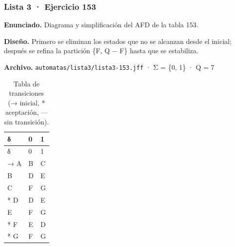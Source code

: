 
\hypertarget{lista-3-ejercicio-153}{%
\subsubsection{Lista 3 · Ejercicio 153}\label{lista-3-ejercicio-153}}

\textbf{Enunciado.} Diagrama y simplificación del AFD de la tabla 153.

\textbf{Diseño.} Primero se eliminan los estados que no se alcanzan desde el inicial; después se refina la partición \{F, Q − F\} hasta que se estabiliza.

\textbf{Archivo.} \texttt{automatas/lista3/lista3-153.jff} · Σ = \{0, 1\} · \textbar Q\textbar{} = 7

\begin{longtable}[]{@{}lll@{}}
\caption{Tabla de transiciones (→ inicial, * aceptación, --- sin transición).}\tabularnewline
\toprule\noalign{}
δ & 0 & 1 \\
\midrule\noalign{}
\endfirsthead
\toprule\noalign{}
δ & 0 & 1 \\
\midrule\noalign{}
\endhead
\bottomrule\noalign{}
\endlastfoot
→ A & B & C \\
B & D & E \\
C & F & G \\
* D & D & E \\
E & F & G \\
* F & E & D \\
* G & F & G \\
\end{longtable}

